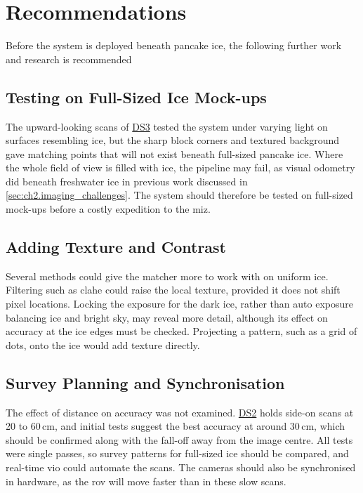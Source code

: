 \chapter{Recommendations}
\label{ch:recommendations}

Before the system is deployed beneath pancake ice, the following further work and research is recommended

\section{Testing on Full-Sized Ice Mock-ups}
The upward-looking scans of \hyperref[sec:ch4.ds3]{DS3} tested the system under varying light on surfaces
resembling ice, but the sharp block corners and textured background gave matching points that will not exist
beneath full-sized pancake ice. Where the whole field of view is filled with ice, the pipeline may fail, as visual
odometry did beneath freshwater ice in previous work discussed in \autoref{sec:ch2.imaging_challenges}. The system should
therefore be tested on full-sized mock-ups before a costly expedition to the \gls{miz}.


\section{Adding Texture and Contrast}
Several methods could give the matcher more to work with on uniform ice. Filtering such as \gls{clahe} could
raise the local texture, provided it does not shift pixel locations. Locking the exposure for the dark ice,
rather than auto exposure balancing ice and bright sky, may reveal more detail, although its effect on accuracy
at the ice edges must be checked. Projecting a pattern, such as a grid of dots, onto the ice would add texture
directly.


\section{Survey Planning and Synchronisation}
The effect of distance on accuracy was not examined. \hyperref[sec:ch4.ds2]{DS2} holds side-on scans at 20 to
60\,cm, and initial tests suggest the best accuracy at around 30\,cm, which should be confirmed along with the
fall-off away from the image centre. All tests were single passes, so survey patterns for full-sized ice should be
compared, and real-time \gls{vio} could automate the scans. The cameras should also be synchronised in hardware,
as the \gls{rov} will move faster than in these slow scans.


